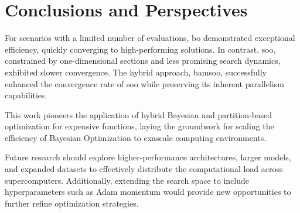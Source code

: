 \section{Conclusions and Perspectives}
\label{sec:conclusion}

For scenarios with a limited number of evaluations, \acrshort{bo} demonstrated exceptional efficiency, quickly converging to high-performing solutions. In contrast, \acrshort{soo}, constrained by one-dimensional sections and less promising search dynamics, exhibited slower convergence. The hybrid approach, \acrshort{bamsoo}, successfully enhanced the convergence rate of \acrshort{soo} while preserving its inherent parallelism capabilities.

This work pioneers the application of hybrid Bayesian and partition-based optimization for expensive functions, laying the groundwork for scaling the efficiency of Bayesian Optimization to exascale computing environments.

Future research should explore higher-performance architectures, larger models, and expanded datasets to effectively distribute the computational load across supercomputers. Additionally, extending the search space to include hyperparameters such as Adam momentum would provide new opportunities to further refine optimization strategies.
